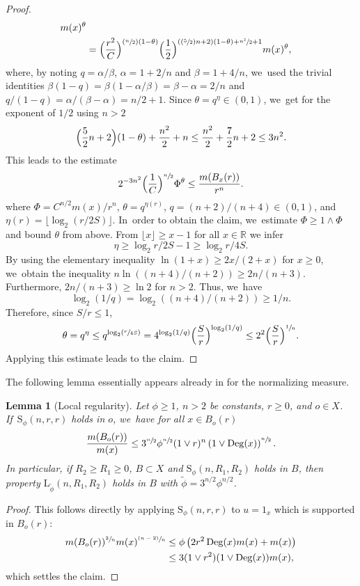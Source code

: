 \documentclass[JEP,XML,SOM,Unicode,published]{cedram}
\newcommand{\Psfrac}[2]{(\sfrac{#1}{#2})}
\newcommand{\psfrac}[2]{\sfrac{(#1)}{#2}}
\newcommand{\rS}{\mathrm{S}}
\newcommand{\rL}{\mathrm{L}}
\theoremstyle{plain}
\newtheorem{lemma}[theorem]{Lemma}
\theoremstyle{definition}
\newcommand{\RR}{\mathbb{R}}
\DeclareMathOperator{\Deg}{Deg}
\begin{document}
\begin{proof}
{\begin{align*}
m(x)^{{\theta}}
\\
&=\Bigl(\frac{r^2}{C }\Bigr)^{\Psfrac{n}{2}(1- {\theta})}
{\Bigl(\frac12\Bigr)^{(\Psfrac52n+2)(1-\theta)+\sfrac{n^2}{2}+1}}
m(x)^{{\theta}},
\end{align*}}
where, by noting $q=\alpha/\beta$, $\alpha=1+2/n$ and $\beta=1+4/n$, we~used the trivial identities $\beta(1-q)=\beta(1-\alpha/\beta)=\beta-\alpha=2/n$ and
$q/(1-q)=\alpha/(\beta-\alpha)=n/2+1$.
Since $ {\theta}=q^{{\eta}}\in(0,1)$, we~get for the exponent of $1/2$ using $ n>2 $
\[
\Bigl(\frac52n+2\Bigr)(1-\theta)+\frac{n^2}{2}+n
\leq \frac{n^2}{2}+\frac{7}{2}n+2 \leq 3 n^2.
\]
This leads to the estimate
\[
2^{-{3}n^2}\Bigl(\frac{1}{C}\Bigr)^{\sfrac{n}{2}}
\Phi^{\theta }
\leq \frac{m(B_x(r))}{r^{n}}.
\]
where $\Phi= C^{{n}/{2}}{m(x)}/{r^{n}} $,
$ \theta =q^{\eta(r)}$, $q=(n+2)/(n+4)\in(0,1)$, and {$ \eta(r)=\lfloor \log_2 (r/2S) \rfloor$}. In~order to obtain the claim, we~estimate $\Phi\geq 1\wedge \Phi$ and bound $\theta$ from above. From $\lfloor x\rfloor\geq x-1$ for all $x\in\RR$ we infer
\[
\eta\geq \log_2{r/2S}-1\geq \log_2{r/4S}.
\]
{By using the elementary inequality $ \ln (1+x)\ge 2x/(2+x) $ for $ x\ge 0 $, we~obtain the inequality
$ n\ln ((n+4)/(n+2))\ge 2n/(n+3) $. Furthermore, $ 2n/(n+3)\ge \ln 2 $ for $ n>2 $. Thus, we~have
\[
\log_2({1/q})=\log_2({(n+4)/(n+2)})\ge 1/n.
\]
}
Therefore, since $S/r\leq1$,
\[
\theta=q^{\eta}\leq {q}^{\log_2(\sfrac{r}{4S})}=4^{\log_2({1/q})}\Bigl(\frac{S}{r}\Bigr)^{\log_2({1/q})}\leq 2^2\Bigl(\frac{S}{r}\Bigr)^{\sfrac{1}{n}}.
\]
Applying this estimate leads to the claim.
\end{proof}

The following lemma essentially appears already in \cite[Lem.\,6.2]{KellerRose-22a} for the normalizing measure.

\begin{lemma}[Local regularity]
\label{lemma:gammanormalized} Let $\phi\geq 1$, $n>2$ be constants, $r \ge 0$, and $o\in X$. If~$\rS_{\phi}(n,r,r)$ holds in $ o $, we~have for all $x\in B_o(r)$
\[
\frac{m(B_o(r))}{m(x)}
\leq {3}^{\sfrac{n}{2}}\phi^{\sfrac{n}{2}}(1\vee r)^n\left(1\vee \Deg(x)\right)^{\sfrac{n}{2}}.
\]
In particular, if $R_2\geq R_1\geq 0$, $B\subset X$ and $\rS_\phi(n,R_1,R_2)$ holds in $B$, then property $\rL_{\tilde\phi}(n,R_1,R_2)$ holds in $B$ with $\tilde \phi={3}^{n/2}\phi^{n/2}$.
\end{lemma}
\begin{proof}
This follows directly by applying $\rS_{\phi}(n,r,r)$ to $ u=1_{x} $ which is supported in $ B_{o}(r) $:
\begin{align*}
m(B_o(r))^{\sfrac{2}{n}} m(x)^{\psfrac{n-2}{n}}&\leq \phi\left({2} r^2\Deg(x)m(x) +m(x)\right)\\
&\leq {3} (1\vee r^2)(1\vee \Deg(x))m(x),
\end{align*}
which settles the claim.
\end{proof}
\end{document}
